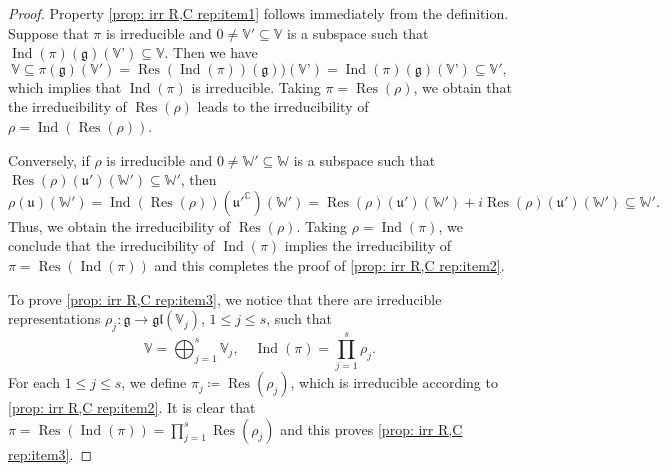 \documentclass[11pt,reqno]{amsart}
\DeclareMathOperator{\Ind}{Ind}
\DeclareMathOperator{\Res}{Res}
\begin{document}
\begin{proof}
Property \eqref{prop: irr R,C rep:item1} follows immediately from the definition.  Suppose that $\pi$ is irreducible and $0 \ne \mathbb{V}' \subseteq \mathbb{V}$ is a subspace such that $\Ind(\pi)(\mathfrak{g})(\mathbb{V}’) \subseteq \mathbb{V}$.  Then we have 
\[
\mathbb{V\subseteq} \pi (\mathfrak{g}) (\mathbb{V}') = \Res (\Ind (\pi)) (\mathfrak{g}) ) (\mathbb{V}’) = \Ind(\pi) (\mathfrak{g}) (\mathbb{V}’) \subseteq \mathbb{V}',
\]
which implies that $\Ind(\pi)$ is irreducible.  Taking $\pi = \Res(\rho)$,  we obtain that the irreducibility of $\Res(\rho)$ leads to the irreducibility of $\rho = \Ind (\Res(\rho))$.  

Conversely,  if $\rho$ is irreducible and $0 \ne \mathbb{W}' \subseteq \mathbb{W}$ is a subspace such that $\Res(\rho) (\mathfrak{u}') (\mathbb{W}') \subseteq \mathbb{W}'$,  then 
\[
\rho (\mathfrak{u}) (\mathbb{W}') = \Ind (\Res(\rho)) \left( {\mathfrak{u}'}^\mathbb{C}\right) \left( \mathbb{W}'\right) =  \Res(\rho)(\mathfrak{u}')(\mathbb{W}')  + i  \Res(\rho)(\mathfrak{u}') (\mathbb{W}') \subseteq \mathbb{W}'. 
\]
Thus,  we obtain the irreducibility of $\Res(\rho)$.  Taking $\rho = \Ind(\pi)$,  we conclude that the irreducibility of $\Ind(\pi)$ implies the irreducibility of $\pi = \Res(\Ind(\pi))$ and this completes the proof of \eqref{prop: irr R,C rep:item2}.

To prove \eqref{prop: irr R,C rep:item3},  we notice that there are irreducible representations $\rho_j: \mathfrak{g} \to \mathfrak{gl}(\mathbb{V}_j)$,  $1 \le j \le s$,  such that 
\[
\mathbb{V} = \bigoplus_{j=1}^s \mathbb{V}_j,\quad \Ind(\pi) = \prod_{j=1}^s \rho_j.
\]
For each $1 \le j \le s$,  we define $\pi_j \coloneqq \Res(\rho_j)$,  which is irreducible according to  \eqref{prop: irr R,C rep:item2}.  It is clear that $\pi = \Res(\Ind(\pi)) = \prod_{j=1}^s \Res(\rho_j)$ and this proves \eqref{prop: irr R,C rep:item3}.
\end{proof}
\end{document}

